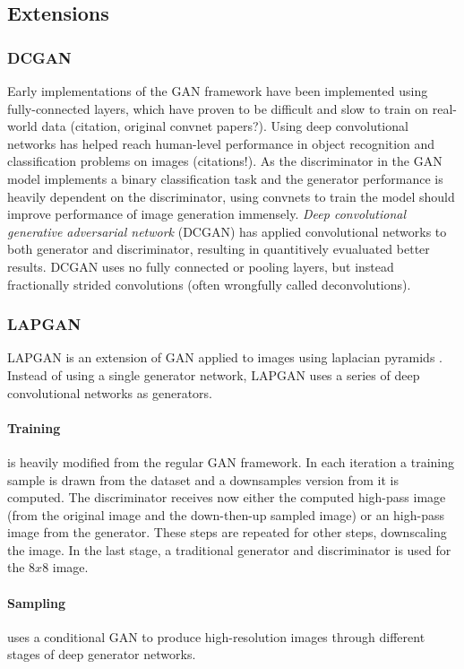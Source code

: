 \subsection{Extensions}
\label{sub:gan_extensions}

\subsubsection{DCGAN \cite{dcgan:2015}}
\label{ssub:dcgan}
Early implementations of the GAN framework have been implemented using fully-connected layers,
which have proven to be difficult and slow to train on real-world data (citation, original convnet papers?).
Using deep convolutional networks has helped reach human-level performance in object recognition and classification problems on images (citations!).
As the discriminator in the GAN model implements a binary classification task and the generator performance is heavily dependent on the discriminator, using convnets to train the model should improve performance of image generation immensely.
\emph{Deep convolutional generative adversarial network} (DCGAN) has applied convolutional networks to both generator and discriminator, resulting in quantitively evualuated better results.
DCGAN uses no fully connected or pooling layers, but instead fractionally strided convolutions (often wrongfully called deconvolutions).

\subsubsection{LAPGAN \cite{lapgan:2015}}
\label{ssub:lapgan}
LAPGAN is an extension of GAN applied to images using laplacian pyramids \cite{laplacian:1983}.
Instead of using a single generator network, LAPGAN uses a series of deep convolutional networks as generators.

\paragraph{Training} is heavily modified from the regular GAN framework.
In each iteration a training sample is drawn from the dataset and a downsamples version from it is computed.
The discriminator receives now either the computed high-pass image (from the original image and the down-then-up sampled image) or an high-pass image from the generator.
These steps are repeated for other steps, downscaling the image.
In the last stage, a traditional generator and discriminator is used for the $8x8$ image.
\paragraph{Sampling} uses a conditional GAN to produce high-resolution images through different stages of deep generator networks.

